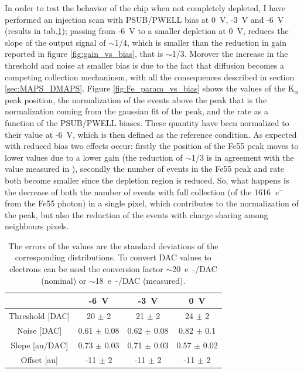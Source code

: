         In order to test the behavior of the chip when not completely depleted, I have performed an injection scan with PSUB/PWELL bias at \SI{0}{V}, -\SI{3}{V} and -\SI{6}{V} (results in tab.\ref{tab:parameters_vs_bias}); passing from -\SI{6}{V} to a smaller depletion at \SI{0}{V}, reduces the slope of the output signal of $\sim$1/4, which is smaller than the reduction in gain reported in figure \ref{fig:gain_vs_bias}, that is $\sim$1/3. Morover the increase in the threshold and noise at smaller bias is due to the fact that diffusion becomes a competing collection mechaninsm, with all the consequences described in section \ref{sec:MAPS_DMAPS}. 
        Figure \ref{fig:Fe_param_vs_bias} shows the values of the K$_\alpha$ peak position, the normalization of the events above the peak that is the normalization coming from the gaussian fit of the peak, and the rate as a function of the PSUB/PWELL biases. These quantity have been normalized to their value at -\SI{6}{V}, which is then defined as the reference condition. 
        As expected with reduced bias two effects occur: firstly the position of the Fe55 peak moves to lower values due to a lower gain (the reduction of $\sim$1/3 is in agreement with the value measured in \cite{M}), secondly the number of events in the Fe55 peak and rate both become smaller since the depletion region is reduced.    
        So, what happens is the decrease of both the number of events with full collection (of the \SI{1616}{\elementarycharge}$^-$ from the Fe55 photon) in a single pixel, which contributes to the normalization of the peak, but also the reduction of the events with charge sharing among neighbours pixels. 
    \begin{table}
            \begin{center}
            \begin{tabular}{| c |  c | c | c |}
            \hline
               & -\SI{6}{V} & -\SI{3}{V} & \SI{0}{V}\\
            \hline
            \hline
            Threshold [DAC] & 20 $\pm$ 2 & 21 $\pm$ 2 & 24 $\pm$ 2\\
            Noise [DAC] & 0.61 $\pm$ 0.08 & 0.62 $\pm$ 0.08 & 0.82 $\pm$ 0.1\\
            Slope [au/DAC] & 0.73 $\pm$ 0.03 & 0.71 $\pm$ 0.03  & 0.57 $\pm$ 0.02\\
            Offset [au] & -11 $\pm$ 2 & -11 $\pm$ 2 & -11 $\pm$ 2 \\
            \hline
            \end{tabular}
            \caption{The errors of the values are the standard deviations of the corresponding distributions. To convert DAC values to electrons can be used the conversion factor $\sim$\SI{20}{e-/DAC} (nominal) or $\sim$\SI{18}{e-/DAC} (measured). }
            \label{tab:parameters_vs_bias}
            \end{center}
        \end{table}  
    
